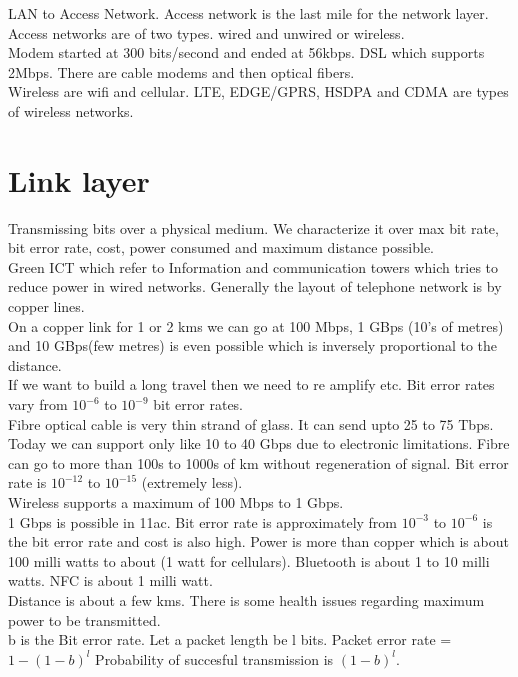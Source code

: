 \documentclass[solution,addpoints,12pt]{exam}
\begin{document}
LAN to Access Network. Access network is the last mile for the
network layer. Access networks are of two types.
wired and unwired or wireless.\\

Modem started at 300 bits/second and ended at 56kbps.
DSL which supports 2Mbps. There are cable modems and then
optical fibers.\\

Wireless are wifi and cellular. LTE, EDGE/GPRS, HSDPA and CDMA are
types of wireless networks.
\section{Link layer}
Transmissing bits over a physical medium. We characterize it
over max bit rate, bit error rate, cost, power consumed and
maximum distance possible.\\
Green ICT which refer to Information and communication towers
which tries to reduce power in wired networks.
Generally the layout of telephone network is by copper lines.\\

On a copper link for 1 or 2 kms we can go at 100 Mbps,
1 GBps (10's of metres) and 10 GBps(few metres) is even possible which
is inversely proportional to the distance.\\
If we want to build a long travel then we need to re amplify etc.
Bit error rates vary from $10^{-6}$ to $10^{-9}$ bit error rates.\\

Fibre optical cable is very thin strand of glass. It can send
upto 25 to 75 Tbps. Today we can support only like 10 to 40 Gbps
due to electronic limitations. Fibre can go to more than
100s to 1000s of km without regeneration of signal.
Bit error rate is $10^{-12}$ to $10^{-15}$ (extremely less).\\
Wireless supports a maximum of 100 Mbps to 1 Gbps.\\
1 Gbps is possible in 11ac. Bit error rate is approximately from
$10^{-3}$ to $10^{-6}$ is the bit error rate and cost is also high.
Power is more than copper which is about 100 milli watts to about
(1 watt for cellulars). Bluetooth is about 1 to 10 milli watts. NFC is
about 1 milli watt.\\

Distance is about a few kms. There is some health issues regarding
maximum power to be transmitted.\\
b is the Bit error rate.
Let a packet length be l bits. Packet error rate = $1 - {(1 - b)}^l$
Probability of succesful transmission is ${(1 - b)}^l$.
\end{document}
